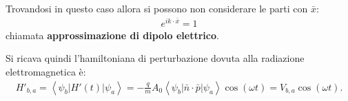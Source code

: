 Trovandosi in questo caso allora si possono non considerare le parti con $\bar x$:
\begin{equation}\begin{split}
e^{ik\cdot \bar x}=1
\end{split}\end{equation}
chiamata \textbf{approssimazione di dipolo elettrico}.

Si ricava quindi l'hamiltoniana di perturbazione dovuta alla radiazione elettromagnetica è:
\begin{equation}\begin{split}
H'_{b,a}=\left\langle \psi _b|H'\left(t\right)|\psi _a \right\rangle=-\frac{q}{m}A_0\left\langle \psi _b\left|\bar n\cdot \bar p\right|\psi _a \right\rangle\cos{\left(\omega t\right)}=V_{b,a}\cos{\left(\omega t\right)}.
\end{split}\end{equation}